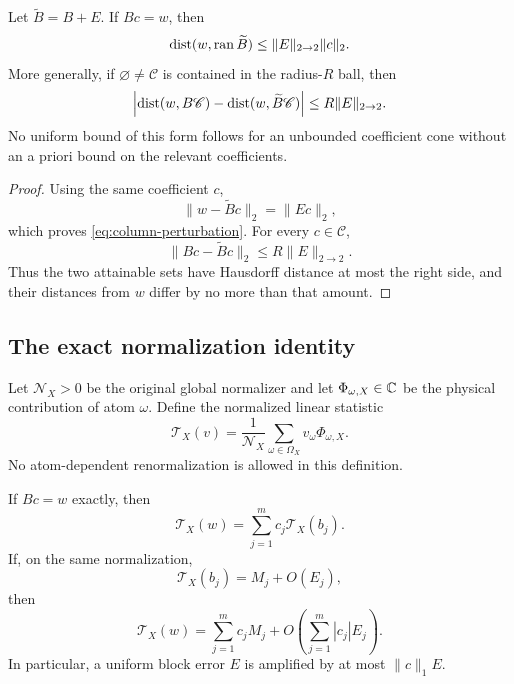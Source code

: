 \begin{proposition}
\label{prop:column-perturbation}
Let \(\widetilde B=B+E\).  If \(Bc=w\), then
\begin{equation}
 \operatorname{dist}(w,\operatorname{ran}\widetilde B)
 \le
 \|E\|_{2\to2}\|c\|_2.
 \label{eq:column-perturbation}
\end{equation}
More generally, if \(\varnothing\ne\mathscr C\) is contained in the
radius-\(R\) ball, then
\begin{equation}
 \left|
 \operatorname{dist}(w,B\mathscr C)
 -
 \operatorname{dist}(w,\widetilde B\mathscr C)
 \right|
 \le
 R\|E\|_{2\to2}.
 \label{eq:allowed-image-stability}
\end{equation}
No uniform bound of this form follows for an unbounded coefficient
cone without an a priori bound on the relevant coefficients.
\end{proposition}

\begin{proof}
Using the same coefficient \(c\),
\[
 \|w-\widetilde Bc\|_2=\|Ec\|_2,
\]
which proves \eqref{eq:column-perturbation}.  For every
\(c\in\mathscr C\),
\[
 \|Bc-\widetilde Bc\|_2\le R\|E\|_{2\to2}.
\]
Thus the two attainable sets have Hausdorff distance at most the
right side, and their distances from \(w\) differ by no more than
that amount.
\end{proof}

\subsection{The exact normalization identity}

Let \(\mathcal N_X>0\) be the original global normalizer and let
\(\Phi_{\omega,X}\in\mathbb C\) be the physical contribution of atom
\(\omega\).  Define the normalized linear statistic
\begin{equation}
 \mathcal T_X(v)
 =
 \frac1{\mathcal N_X}
 \sum_{\omega\in\Omega_X}
 v_\omega\Phi_{\omega,X}.
 \label{eq:physical-functional}
\end{equation}
No atom-dependent renormalization is allowed in this definition.

\begin{theorem}
\label{thm:exact-reassembly}
If \(Bc=w\) exactly, then
\begin{equation}
 \mathcal T_X(w)
 =
 \sum_{j=1}^m c_j\mathcal T_X(b_j).
 \label{eq:exact-physical-reassembly}
\end{equation}
If, on the same normalization,
\[
 \mathcal T_X(b_j)=M_j+O(E_j),
\]
then
\begin{equation}
 \mathcal T_X(w)
 =
 \sum_{j=1}^m c_jM_j
 +
 O\!\left(\sum_{j=1}^m|c_j|E_j\right).
 \label{eq:coefficient-amplification}
\end{equation}
In particular, a uniform block error \(E\) is amplified by at most
\(\|c\|_1E\).
\end{theorem}

